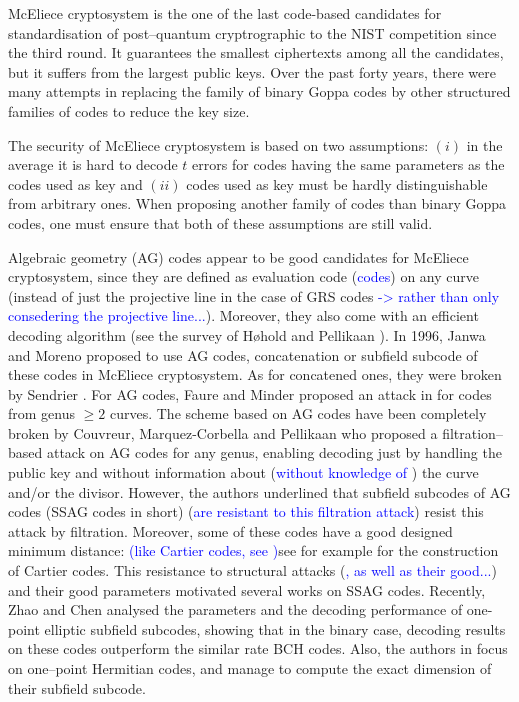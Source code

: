 \documentclass[a4paper]{article}
\theoremstyle{definition}
\theoremstyle{remark}
\newcommand\sabira[1]{\textcolor{blue}{#1}}
\begin{document}
McEliece cryptosystem is the one of the last code-based candidates for standardisation of post--quantum cryptrographic to the NIST competition since the third round. It guarantees the smallest ciphertexts among all the candidates, but it suffers from the largest public keys. Over the past forty years, there were many attempts in replacing the family of binary Goppa codes by other structured families of codes to reduce the key size.

The security of McEliece cryptosystem is based on two assumptions: $(i)$ in the average it is hard to decode $t$ errors for codes having the same parameters as the codes used as key and $(ii)$ codes used as key must be hardly distinguishable from arbitrary ones. When proposing another family of codes than binary Goppa codes, one must ensure that both of these assumptions are still valid.

Algebraic geometry (AG) codes appear to be good candidates for McEliece cryptosystem, since they are defined as evaluation code (\sabira{codes}) on any curve (instead of just the projective line in the case of GRS codes \sabira{-> rather than only consedering the projective line...}). Moreover, they also come with an efficient decoding algorithm (see the survey of Høhold and Pellikaan \cite{HP95}).
In 1996, Janwa and Moreno \cite{JM96} proposed to use AG codes, concatenation or subfield subcode of these codes in McEliece cryptosystem. As for concatened ones, they were broken by Sendrier \cite{Sen94}. For AG codes, Faure and Minder proposed an attack in \cite{FM08,Min07,Fau09} for codes from genus $\geq 2$ curves. The scheme based on AG codes have been completely broken by Couvreur, Marquez-Corbella and Pellikaan \cite{CMR17} who proposed a filtration--based attack on AG codes for any genus, enabling decoding just by handling the public key and without information about (\sabira{without knowledge of }) the curve and/or the divisor. However, the authors underlined that subfield subcodes of AG codes (SSAG codes in short) (\sabira{are resistant to this filtration attack}) resist this attack by filtration. Moreover, some of these codes have a good designed minimum distance: \sabira{(like Cartier codes, see \cite{Cou14} )}see for example \cite{Cou14} for the construction of Cartier codes. This resistance to structural attacks (\sabira{, as well as their good...}) and their good parameters motivated several works on SSAG codes. Recently, Zhao and Chen \cite{ZC22} analysed the parameters and the decoding performance of one-point elliptic subfield subcodes, showing that in the binary case, decoding results on these codes outperform the similar rate BCH codes. Also, the authors in \cite{PJ14,EKN21} focus on one--point Hermitian codes, and manage to compute the exact dimension of their subfield subcode. 
\end{document}

